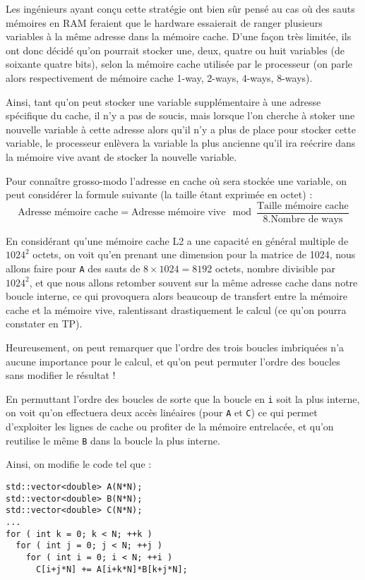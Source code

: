 \documentclass[fleqn,11pt]{article}
\begin{document}
Les ingénieurs ayant conçu cette stratégie ont bien sûr pensé au cas où des sauts mémoires en RAM feraient que le hardware essaierait de ranger plusieurs variables à la même adresse dans la mémoire cache. D'une façon très limitée, ils ont donc décidé qu'on pourrait stocker une, deux, quatre ou huit variables (de soixante quatre bits), selon la mémoire cache utilisée par le processeur (on parle alors respectivement de mémoire cache 1-way, 2-ways, 4-ways, 8-ways).

Ainsi, tant qu'on peut stocker une variable supplémentaire à une adresse spécifique du cache, il n'y a pas de soucis, mais lorsque l'on cherche à stoker une nouvelle variable à cette adresse alors qu'il n'y a plus de place pour stocker cette variable, le processeur enlèvera la variable la plus ancienne qu'il ira reécrire dans la mémoire vive avant de stocker la nouvelle variable. 

Pour connaître grosso-modo l'adresse en cache où sera stockée une variable, on peut considérer la formule suivante (la taille étant exprimée en octet) :
\[
\textrm{Adresse mémoire cache} = \textrm{Adresse mémoire vive} \mod \frac{\textrm{Taille mémoire cache}}{8.\textrm{Nombre de ways}}
\]

En considérant qu'une mémoire cache L2 a une capacité en général multiple de $1024^{2}$ octets, on voit
qu'en prenant une dimension pour la matrice de 1024, nous allons faire pour \texttt{A} des sauts de
$8\times 1024 = 8192$ octets, nombre divisible par $1024^{2}$, et que nous allons retomber souvent sur la
même adresse cache dans notre boucle interne, ce qui provoquera alors beaucoup de transfert entre la mémoire cache et la mémoire vive, ralentissant drastiquement le calcul (ce qu'on pourra constater en TP).

Heureusement, on peut remarquer que l'ordre des trois boucles imbriquées n'a aucune importance pour le
calcul, et qu'on peut permuter l'ordre des boucles sans modifier le résultat !

En permuttant l'ordre des boucles de sorte que la boucle en \texttt{i} soit la plus interne, on voit qu'on effectuera deux accès linéaires (pour \texttt{A} et \texttt{C}) ce qui permet d'exploiter les lignes de cache ou profiter de la mémoire entrelacée, et qu'on reutilise le même \texttt{B} dans la boucle la plus interne.

Ainsi, on modifie le code tel que :

\begin{lstlisting}
std::vector<double> A(N*N);
std::vector<double> B(N*N);
std::vector<double> C(N*N);
...
for ( int k = 0; k < N; ++k )
  for ( int j = 0; j < N; ++j )
    for ( int i = 0; i < N; ++i )
      C[i+j*N] += A[i+k*N]*B[k+j*N];
\end{lstlisting}
\end{document}
